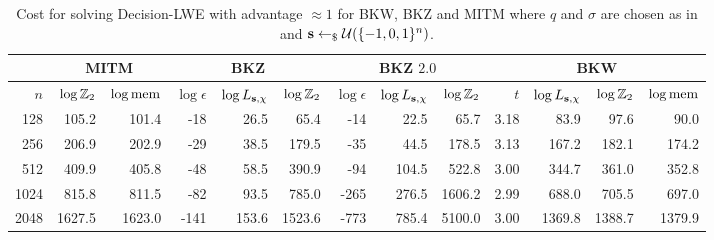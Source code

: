 \begin{table}
\centering{}
{
\begin{tabular}{|r||r|r||r|r|r||r|r|r||r|r|r|r|}
\hline
   & \multicolumn{2}{|c||}{MITM}& \multicolumn{3}{|c||}{BKZ \cite{LindnerP10}} & \multicolumn{3}{|c||}{BKZ $2.0$ \cite{liu-nguyen:ctrsa2013}} & \multicolumn{4}{|c|}{BKW \cite{albrecht-cid-faugere-fitzpatrick-perret:dcc2013}}\\
\hline
$n$ & $\log \mathbb{Z}_2$ & $\log \textnormal{mem}$ & $\log \epsilon$ & $\log L_{\mathbf{s},\chi}$ & $\log \mathbb{Z}_2$ & $\log \epsilon$ & $\log L_{\mathbf{s},\chi}$ & $\log \mathbb{Z}_2$ & $t$ &  $\log L_{\mathbf{s},\chi}$ & $\log \mathbb{Z}_2$ & $\log \textnormal{mem}$\\
\hline
  128 &  105.2 &  101.4 &    -18 &     26.5 &     65.4 &    -14 &     22.5 &     65.7 &  3.18 &     83.9 &     97.6 &     90.0 \\
  256 &  206.9 &  202.9 &    -29 &     38.5 &    179.5 &    -35 &     44.5 &    178.5 &  3.13 &    167.2 &    182.1 &    174.2 \\
  512 &  409.9 &  405.8 &    -48 &     58.5 &    390.9 &    -94 &    104.5 &    522.8 &  3.00 &    344.7 &    361.0 &    352.8 \\
 1024 &  815.8 &  811.5 &    -82 &     93.5 &    785.0 &   -265 &    276.5 &   1606.2 &  2.99 &    688.0 &    705.5 &    697.0 \\
 2048 & 1627.5 & 1623.0 &   -141 &    153.6 &   1523.6 &   -773 &    785.4 &   5100.0 &  3.00 &   1369.8 &   1388.7 &   1379.9 \\
\hline
\end{tabular}
}
\caption{Cost for solving Decision-LWE with advantage $\approx 1$ for BKW, BKZ and MITM where $q$ and $\sigma$ are chosen as in \cite{regev:acm09} and 
$\mathbf{s} \leftarrow_{\$} \mathcal{U}(\{-1,0,1\}^{n})$.}
\label{tab:nomodred2}
\end{table}



